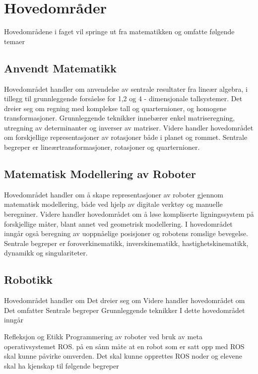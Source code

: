 \section*{Hovedområder} \label{Sec: Hovedomraader}

Hovedområdene i faget vil springe ut fra matematikken og omfatte følgende temaer


\subsection*{Anvendt Matematikk}

    Hovedområdet handler om anvendelse av sentrale resultater fra lineær algebra, i tillegg til grunnleggende forsåelse for 1,2 og 4 - dimensjonale tallsystemer. Det dreier seg om regning med komplekse tall og quarternioner, og homogene transformasjoner. Grunnleggende teknikker innebærer enkel matriseregning, utregning av determinanter og inverser av matriser. Videre handler hovedområdet om forskjellige representasjoner av rotasjoner både i planet og rommet. Sentrale begreper er lineærtransformasjoner, rotasjoner og quarternioner.


\subsection*{Matematisk Modellering av Roboter}

    Hovedområdet handler om å skape representasjoner av roboter gjennom matematisk modellering, både ved hjelp av digitale verktøy og manuelle beregniner.
    Videre handler hovedområdet om å løse kompliserte ligningssystem på forskjellige måter, blant annet ved geometrisk modellering. I hovedområdet inngår også beregning av uoppnåelige posisjoner og robotens romslige bevegelse. Sentrale begreper er foroverkinematikk, inverskinematikk, hastighetskinematikk, dynamikk og singulariteter.


\subsection*{Robotikk}

    Hovedområdet handler om
    Det dreier seg om
    Videre handler hovedområdet om
    Det omfatter
    Sentrale begreper
    Grunnleggende teknikker
    I dette hovedområdet inngår

    Refleksjon og Etikk
    Programmering av roboter ved bruk av meta operativsystemet ROS.
     på en sånn måte at en robot som er satt opp med ROS skal kunne påvirke omverden. Det skal kunne opprettes ROS noder og elevene skal ha kjenskap til følgende begreper


